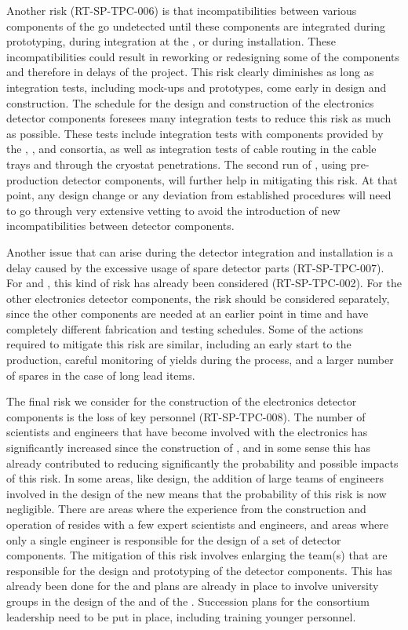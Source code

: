 Another risk (RT-SP-TPC-006) is that incompatibilities 
between various components of the   go undetected until
these components are integrated during prototyping, during integration at 
the , or during installation. These incompatibilities could 
result in reworking or redesigning some of the components and therefore in
delays of the project. This risk clearly
diminishes as long as integration tests, including mock-ups and prototypes,
come early in design and construction. The schedule for the 
design and construction of the  electronics detector components foresees many
integration tests to reduce this risk as much as possible. These tests include 
integration tests with components provided by the , , 
and  consortia, as well as integration tests of cable routing in 
the cable trays and through the cryostat penetrations. The second run of 
, using pre-production detector components, will further help
in mitigating this risk. At that point, any design change or any deviation from
established procedures will need to go through very extensive vetting to
avoid the introduction of new incompatibilities between detector components.

Another issue that can arise during the detector integration and installation
is a delay caused by the excessive usage of spare detector parts (RT-SP-TPC-007).
For  and , this kind of risk has already been considered
(RT-SP-TPC-002). For the other  electronics detector components, the
risk should be considered separately, since the other components are needed 
at an earlier point in time and have completely different fabrication and
testing schedules. Some of the actions required to mitigate this risk are
similar, including an early start to the production, careful monitoring of yields
during the  process, and a larger number of spares in the case of
long lead items. 

The final risk we consider for the construction of the  electronics
detector components is the loss of key personnel (RT-SP-TPC-008). The number of
scientists and engineers that have become involved with the 
electronics has significantly increased since the construction of ,
and in some sense this has already contributed to reducing significantly the
probability and possible impacts of this risk. In some areas, like 
design, the addition of large teams of engineers involved in the design of
the new  means that the probability of this risk is now negligible.
There are areas where the experience from the construction and operation
of  resides with a few expert scientists and engineers, and areas
where only a single engineer is responsible for the design of a set of detector
components. The mitigation of this risk involves enlarging the team(s) that
are responsible for the design and prototyping of the detector components.
This has already been done for the  and plans are already 
in place to involve university groups in the design of the 
and of the . Succession plans for the consortium leadership
need to be put in place, including training younger personnel. 

